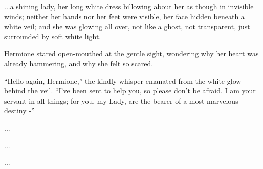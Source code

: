 ...a shining lady, her long white dress billowing about her as
though in invisible winds; neither her hands nor her feet were visible,
her face hidden beneath a white veil; and she was glowing all over, not
like a ghost, not transparent, just surrounded by soft white light.

Hermione stared open-mouthed at the gentle sight, wondering why her
heart was already hammering, and why she felt so scared.

``Hello again, Hermione,'' the kindly whisper emanated from the white
glow behind the veil. ``I've been sent to help you, so please don't be
afraid. I am your servant in all things; for you, my Lady, are the
bearer of a most marvelous destiny -''

...

...

...
